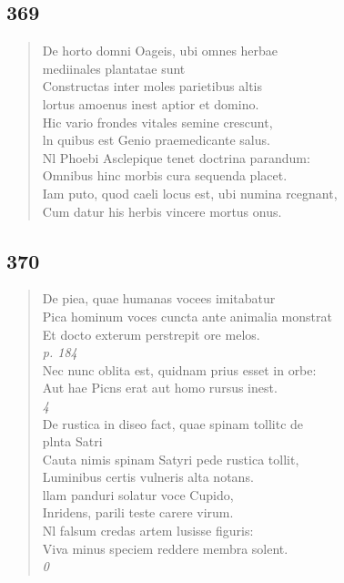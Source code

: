 \documentclass[11pt, a4paper]{report}
\begin{document}
            \subsection*{369}
      \begin{verse}
      De horto domni Oageis, ubi omnes herbae \\ mediinales plantatae sunt \\ Constructas inter moles parietibus altis \\ lortus amoenus inest aptior et domino. \\ Hic vario frondes vitales semine crescunt, \\ ln quibus est Genio praemedicante salus. \\ Nl Phoebi Asclepique tenet doctrina parandum: \\ Omnibus hinc morbis cura sequenda placet. \\ Iam puto, quod caeli locus est, ubi numina rcegnant, \\ Cum datur his herbis vincere mortus onus. \\ 
      \end{verse}
  
            \subsection*{370}
      \begin{verse}
      De piea, quae humanas vocees imitabatur \\ Pica hominum voces cuncta ante animalia monstrat \\ Et docto exterum perstrepit ore melos. \\ \textit{p. 184} \\ 
        ﻿\pagebreak 
    Nec nunc oblita est, quidnam prius esset in orbe: \\ Aut hae Picns erat aut homo rursus inest. \\ \textit{4} \\ De rustica in diseo fact, quae spinam tollitc de \\ plnta Satri \\ Cauta nimis spinam Satyri pede rustica tollit, \\ Luminibus certis vulneris alta notans. \\ llam panduri solatur voce Cupido, \\ Inridens, parili teste carere virum. \\ Nl falsum credas artem lusisse figuris: \\ Viva minus speciem reddere membra solent. \\ \textit{0} \\ 
      \end{verse}
  
\end{document}
